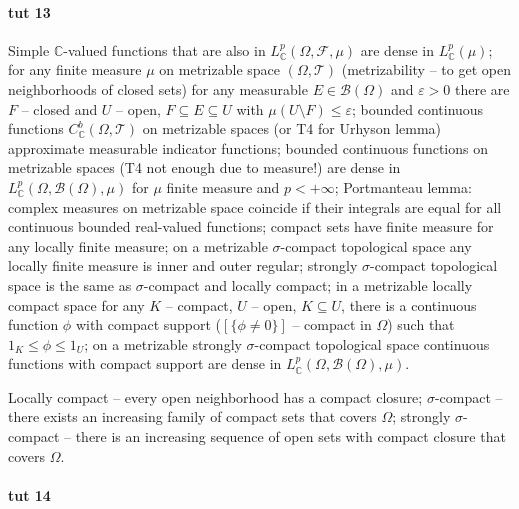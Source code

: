 \documentclass[a4paper]{article}
\newcommand{\Fcal}{\mathcal{F}}
\newcommand{\Tcal}{\mathcal{T}}
\newcommand{\Bcal}{\mathcal{B}}
\newcommand{\cplx}{\mathbb{C}}
\begin{document}


\paragraph{tut 13} %
\label{par:tut_13}

Simple $\cplx$-valued functions that are also in $L^p_\cplx(\Omega, \Fcal, \mu)$ are
dense in $L^p_\cplx(\mu)$;
%
for any finite measure $\mu$ on metrizable space $(\Omega, \Tcal)$
(metrizability -- to get open neighborhoods of closed sets) for any measurable
$E \in \Bcal(\Omega)$ and $\varepsilon > 0$ there are $F$ -- closed and $U$ -- open,
$F \subseteq E \subseteq U$ with $\mu(U \setminus F) \leq \varepsilon$;
%
bounded continuous functions $C_\cplx^b(\Omega, \Tcal)$ on metrizable spaces
(or T4 for Urhyson lemma) approximate measurable indicator functions;
%
bounded continuous functions on metrizable spaces (T4 not enough due to measure!)
are dense in $L^p_\cplx(\Omega, \Bcal(\Omega), \mu)$ for $\mu$ finite measure and
$p < +\infty$;
%
Portmanteau lemma: complex measures on metrizable space coincide if their integrals
are equal for all continuous bounded real-valued functions;
%
compact sets have finite measure for any locally finite measure;
%
on a metrizable $\sigma$-compact topological space any locally finite measure is
inner and outer regular;
%
strongly $\sigma$-compact topological space is the same as $\sigma$-compact and
locally compact;
%
in a metrizable locally compact space for any $K$ -- compact, $U$ -- open, $K \subseteq U$,
there is a continuous function $\phi$ with compact support ($[\{\phi \neq 0\}]$
-- compact in $\Omega$) such that $1_K \leq \phi \leq 1_U$;
%
on a metrizable strongly $\sigma$-compact topological space continuous functions
with compact support are dense in $L^p_\cplx(\Omega, \Bcal(\Omega), \mu)$.

Locally compact -- every open neighborhood has a compact closure;
%
$\sigma$-compact -- there exists an increasing family of compact sets that covers $\Omega$;
%
strongly $\sigma$-compact -- there is an increasing sequence of open sets with compact
closure that covers $\Omega$.



\paragraph{tut 14} %
\label{par:tut_14}
\end{document}
